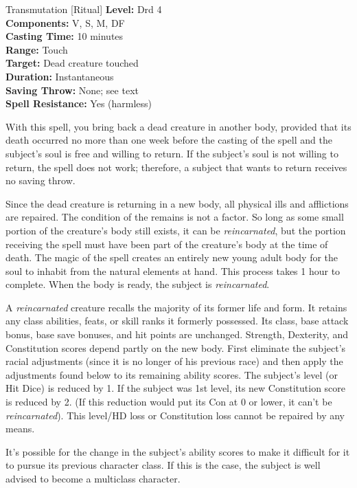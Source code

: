 {Transmutation [Ritual]}
{
	\textbf{Level:}
	Drd 4\\
	\textbf{Components:}
	V, S, M, DF\\
	\textbf{Casting Time:}
	10 minutes\\
	\textbf{Range:}
	Touch\\
	\textbf{Target:}
	Dead creature touched\\
	\textbf{Duration:}
	Instantaneous\\
	\textbf{Saving Throw:}
	None; see text\\
	\textbf{Spell Resistance:}
	Yes (harmless)\\
}
{
	With this spell, you bring back a dead creature in another body, provided that its death occurred no more than one week before the casting of the spell and the subject's soul is free and willing to return. If the subject's soul is not willing to return, the spell does not work; therefore, a subject that wants to return receives no saving throw.

	Since the dead creature is returning in a new body, all physical ills and afflictions are repaired. The condition of the remains is not a factor. So long as some small portion of the creature's body still exists, it can be \emph{reincarnated}, but the portion receiving the spell must have been part of the creature's body at the time of death. The magic of the spell creates an entirely new young adult body for the soul to inhabit from the natural elements at hand. This process takes 1 hour to complete.  When the body is ready, the subject is \emph{reincarnated}.

	A \emph{reincarnated} creature recalls the majority of its former life and form. It retains any class abilities, feats, or skill ranks it formerly possessed. Its class, base attack bonus, base save bonuses, and hit points are unchanged. Strength, Dexterity, and Constitution scores depend partly on the new body. First eliminate the subject's racial adjustments (since it is no longer of his previous race) and then apply the adjustments found below to its remaining ability scores. The subject's level (or Hit Dice) is reduced by 1. If the subject was 1st level, its new Constitution score is reduced by 2. (If this reduction would put its Con at 0 or lower, it can't be \emph{reincarnated}). This level/HD loss or Constitution loss cannot be repaired by any means.

	It's possible for the change in the subject's ability scores to make it difficult for it to pursue its previous character class. If this is the case, the subject is well advised to become a multiclass character.

}
